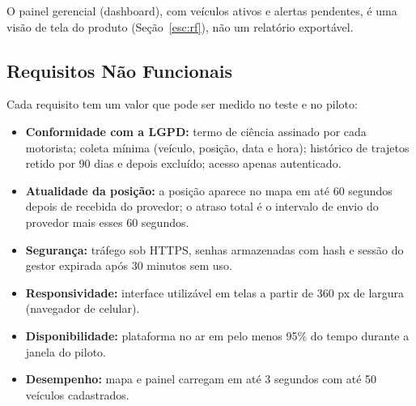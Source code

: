 \documentclass[11pt,a4paper]{article}
\begin{document}
\noindent O painel gerencial (dashboard), com veículos ativos e alertas pendentes, é uma visão de tela do produto (Seção~\ref{esc:rf}), não um relatório exportável.

\subsection{Requisitos Não Funcionais}\label{esc:rnf}
Cada requisito tem um valor que pode ser medido no teste e no piloto:
\begin{itemize}[itemsep=2pt]
  \item \textbf{Conformidade com a LGPD:} termo de ciência assinado por cada motorista; coleta mínima (veículo, posição, data e hora); histórico de trajetos retido por 90 dias e depois excluído; acesso apenas autenticado.
  \item \textbf{Atualidade da posição:} a posição aparece no mapa em até 60 segundos depois de recebida do provedor; o atraso total é o intervalo de envio do provedor mais esses 60 segundos.
  \item \textbf{Segurança:} tráfego sob HTTPS, senhas armazenadas com hash e sessão do gestor expirada após 30 minutos sem uso.
  \item \textbf{Responsividade:} interface utilizável em telas a partir de 360 px de largura (navegador de celular).
  \item \textbf{Disponibilidade:} plataforma no ar em pelo menos 95\% do tempo durante a janela do piloto.
  \item \textbf{Desempenho:} mapa e painel carregam em até 3 segundos com até 50 veículos cadastrados.
\end{itemize}
\end{document}
